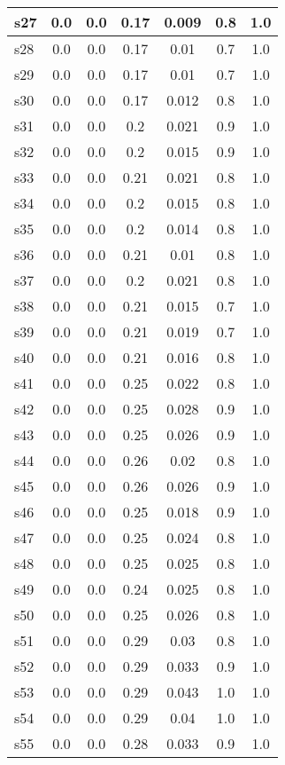 \documentclass{article}
\begin{document}
\begin{tabular}{|l|c|c|c|c|c|c|}
\hline
s27 &0.0 & 0.0 & 0.17 & 0.009 & 0.8 & 1.0\\
\hline
s28 &0.0 & 0.0 & 0.17 & 0.01 & 0.7 & 1.0\\
\hline
s29 &0.0 & 0.0 & 0.17 & 0.01 & 0.7 & 1.0\\
\hline
s30 &0.0 & 0.0 & 0.17 & 0.012 & 0.8 & 1.0\\
\hline
s31 &0.0 & 0.0 & 0.2 & 0.021 & 0.9 & 1.0\\
\hline
s32 &0.0 & 0.0 & 0.2 & 0.015 & 0.9 & 1.0\\
\hline
s33 &0.0 & 0.0 & 0.21 & 0.021 & 0.8 & 1.0\\
\hline
s34 &0.0 & 0.0 & 0.2 & 0.015 & 0.8 & 1.0\\
\hline
s35 &0.0 & 0.0 & 0.2 & 0.014 & 0.8 & 1.0\\
\hline
s36 &0.0 & 0.0 & 0.21 & 0.01 & 0.8 & 1.0\\
\hline
s37 &0.0 & 0.0 & 0.2 & 0.021 & 0.8 & 1.0\\
\hline
s38 &0.0 & 0.0 & 0.21 & 0.015 & 0.7 & 1.0\\
\hline
s39 &0.0 & 0.0 & 0.21 & 0.019 & 0.7 & 1.0\\
\hline
s40 &0.0 & 0.0 & 0.21 & 0.016 & 0.8 & 1.0\\
\hline
s41 &0.0 & 0.0 & 0.25 & 0.022 & 0.8 & 1.0\\
\hline
s42 &0.0 & 0.0 & 0.25 & 0.028 & 0.9 & 1.0\\
\hline
s43 &0.0 & 0.0 & 0.25 & 0.026 & 0.9 & 1.0\\
\hline
s44 &0.0 & 0.0 & 0.26 & 0.02 & 0.8 & 1.0\\
\hline
s45 &0.0 & 0.0 & 0.26 & 0.026 & 0.9 & 1.0\\
\hline
s46 &0.0 & 0.0 & 0.25 & 0.018 & 0.9 & 1.0\\
\hline
s47 &0.0 & 0.0 & 0.25 & 0.024 & 0.8 & 1.0\\
\hline
s48 &0.0 & 0.0 & 0.25 & 0.025 & 0.8 & 1.0\\
\hline
s49 &0.0 & 0.0 & 0.24 & 0.025 & 0.8 & 1.0\\
\hline
s50 &0.0 & 0.0 & 0.25 & 0.026 & 0.8 & 1.0\\
\hline
s51 &0.0 & 0.0 & 0.29 & 0.03 & 0.8 & 1.0\\
\hline
s52 &0.0 & 0.0 & 0.29 & 0.033 & 0.9 & 1.0\\
\hline
s53 &0.0 & 0.0 & 0.29 & 0.043 & 1.0 & 1.0\\
\hline
s54 &0.0 & 0.0 & 0.29 & 0.04 & 1.0 & 1.0\\
\hline
s55 &0.0 & 0.0 & 0.28 & 0.033 & 0.9 & 1.0\\

\end{tabular}
\end{document}
